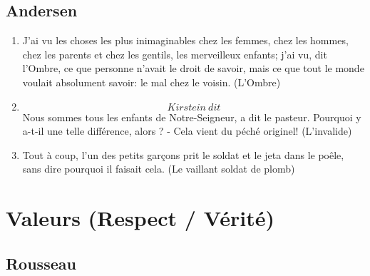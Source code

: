 \documentclass[a4paper, 11pt, hidelinks]{article}
\begin{document}
\subsection{Andersen}


\begin{enumerate}
    \item J'ai vu les choses les plus inimaginables chez les femmes, chez les hommes, chez les parents et chez les gentils, les merveilleux enfants; j'ai vu, dit l'Ombre, ce que personne n'avait le droit de savoir, mais ce que tout le monde voulait absolument savoir: le mal chez le voisin. (L'Ombre) 
    \item \[ Kirstein \ dit \] Nous sommes tous les enfants de Notre-Seigneur, a dit le pasteur. Pourquoi y a-t-il une telle différence, alors ? - Cela vient du péché originel! (L'invalide)
    \item Tout à coup, l'un des petits garçons prit le soldat et le jeta dans le poêle, sans dire pourquoi il faisait cela. (Le vaillant soldat de plomb)
\end{enumerate}



























\section{Valeurs (Respect / Vérité)}



\subsection{Rousseau}
\end{document}
